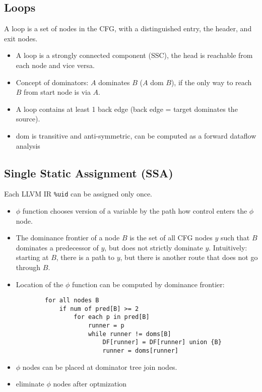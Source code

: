\subsection*{Loops}
A loop is a set of nodes in the CFG, with a distinguished entry, the header, and exit nodes.
\begin{itemize}
	\item A loop is a strongly connected component (SSC), the head is reachable from each node and vice versa.
	\item Concept of dominators: $A$ dominates $B$ ($A$ dom $B$), if the only way to reach $B$ from start node is via $A$. 
	\item A loop contains at least 1 back edge (back edge = target dominates the source).
	\item dom is transitive and anti-symmetric, can be computed as a forward dataflow analysis
\end{itemize}


\subsection*{Single Static Assignment (SSA)}
Each LLVM IR \texttt{\%uid} can be assigned only once.
\begin{itemize}
	\item $\phi$ function chooses version of a variable by the path how control enters the $\phi$ node.
	
	\item The dominance frontier of a node $B$ is the set of all CFG nodes $y$ such that $B$ dominates a predecessor of $y$, but does not strictly dominate $y$. Intuitively: starting at $B$, there is a path to $y$, but there is another route that does not go through $B$.
	
	\item Location of the $\phi$ function can be computed by dominance frontier:
	\begin{lstlisting}
		for all nodes B
			if num of pred[B] >= 2
				for each p in pred[B]
					runner = p
					while runner != doms[B]
						DF[runner] = DF[runner] union {B}
						runner = doms[runner]
	\end{lstlisting}
		
	\item $\phi$ nodes can be placed at dominator tree join nodes.
	
	\item eliminate $\phi$ nodes after optmization
\end{itemize}
